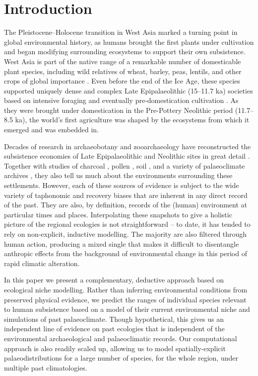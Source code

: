 \documentclass[
  authoryear,
  preprint]{elsarticle}
\begin{document}
\section{Introduction}\label{introduction}

The Pleistocene--Holocene transition in West Asia marked a turning point
in global environmental history, as humans brought the first plants
under cultivation and began modifying surrounding ecosystems to support
their own subsistence. West Asia is part of the native range of a
remarkable number of domesticable plant species, including wild
relatives of wheat, barley, peas, lentils, and other crops of global
importance \citep{cite}. Even before the end of the Ice Age, these
species supported uniquely dense and complex Late Epipalaeolithic
(15--11.7 ka) societies based on intensive foraging \citep{cite} and
eventually pre-domestication cultivation \citep{cite}. As they were
brought under domestication in the Pre-Pottery Neolithic period
(11.7--8.5 ka), the world's first agriculture was shaped by the
ecosystems from which it emerged and was embedded in.

Decades of research in archaeobotany and zooarchaeology have
reconstructed the subsistence economies of Late Epipalaeolithic and
Neolithic sites in great detail \citep{cites}. Together with studies of
charcoal \citep{cite}, pollen \citep{cite}, soil \citep{cite}, and a
variety of palaeoclimate archives \citep{JonesEtAl2019}, they also tell
us much about the environments surrounding these settlements. However,
each of these sources of evidence is subject to the wide variety of
taphonomic and recovery biases that are inherent in any direct record of
the past. They are also, by definition, records of the (human)
environment at particular times and places. Interpolating these
snapshots to give a holistic picture of the regional ecologies is not
straightforward -- to date, it has tended to rely on non-explicit,
inductive modelling. The majority are also filtered through human
action, producing a mixed single that makes it difficult to disentangle
anthropic effects from the background of environmental change in this
period of rapid climatic alteration.

In this paper we present a complementary, deductive approach based on
ecological niche modelling. Rather than inferring environmental
conditions from preserved physical evidence, we predict the ranges of
individual species relevant to human subsistence based on a model of
their current environmental niche and simulations of past palaeoclimate.
Though hypothetical, this gives us an independent line of evidence on
past ecologies that is independent of the environmental archaeological
and palaeoclimatic records. Our computational approach is also readily
scaled up, allowing us to model spatially-explicit palaeodistributions
for a large number of species, for the whole region, under multiple past
climatologies.
\end{document}
